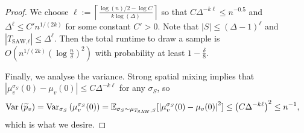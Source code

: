 \documentclass{theoretics}
\newcommand{\htodo}[1]{\todo[color=green!30]{Heng: #1}}
\newcommand{\Ex}{\mathop{\mathbb{{}E}}\nolimits}
\newcommand{\abs}[1]{\ensuremath{\left\vert#1\right\vert}}
\newcommand{\Var}[2]{\ensuremath{\textnormal{Var}_{#1}\left(#2\right)}}
\newcommand{\defeq}{:=}
\newcommand{\TSAW}{T_{\mathrm{SAW}}}
\begin{document}
\begin{proof}
We choose $\ell\defeq\left\lceil\frac{\log(n)/2-\log C}{k\log(\Delta)}\right\rceil$ so that $C\Delta^{-k\ell}\le n^{-0.5}$ and $\Delta^\ell\le C' n^{1/(2k)}$ for some constant $C'>0$. 
Note that $|S|\le(\Delta-1)^\ell$ and $|T_\textrm{SAW,$\ell$}|\le \Delta^\ell$. 
Then the total runtime to draw a sample is $O(n^{1/(2k)}(\log \frac{n}{\delta})^2)$ with probability at least $1-\frac{\delta}{8}$.


Finally, we analyse the variance. Strong spatial mixing implies that $\abs{\mu_v^{\sigma_S}(0)-\mu_v(0)}\leq C\Delta^{-k\ell}$ for any $\sigma_S$, so
\begin{align}  \label{eqn:var-error}
  \Var{}{\widetilde{p}_v}=\Var{\sigma_S}{\mu_v^{\sigma_S}(0)}=\Ex_{\sigma_S\sim\mu_{\TSAW,S}}[\abs{\mu_v^{\sigma_S}(0)-\mu_v(0)}^2]
  &\leq \left(C\Delta^{-k\ell}\right)^2\leq n^{-1},
\end{align}
which is what we desire.
\end{proof}
\end{document}
